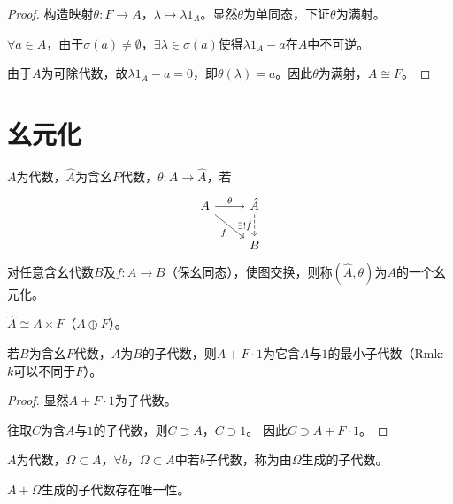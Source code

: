 \documentclass[lang=cn,a4paper,newtx,section]{elegantbook}
\begin{document}
\begin{proof}
  构造映射$\theta: F \to A$，$\lambda \mapsto \lambda 1_A$。显然$\theta$为单同态，下证$\theta$为满射。
  
  $\forall a \in A$，由于$\sigma(a) \neq \emptyset$，$\exists \lambda \in \sigma(a)$使得$\lambda 1_A - a$在$A$中不可逆。
  
  由于$A$为可除代数，故$\lambda 1_A - a = 0$，即$\theta(\lambda) = a$。因此$\theta$为满射，$A \cong F$。
\end{proof}

\section{幺元化}

\begin{definition}[幺元化]
  $A$为代数，$\hat{A}$为含幺$F$代数，$\theta: A \to \hat{A}$，若
  \begin{equation*}
    \begin{tikzcd}
      A \arrow[r, "\theta"] \arrow[dr, "f"'] & \hat{A} \arrow[d, "\exists! \hat{f}"', dashed] \\
      & B
    \end{tikzcd}
  \end{equation*}
  对任意含幺代数$B$及$f: A \to B$（保幺同态），使图交换，则称$(\hat{A}, \theta)$为$A$的一个幺元化。
\end{definition}

\begin{remark}[Banach代数幺元化]
  $\hat{A} \cong A \times F$（$A \oplus F$）。
\end{remark}

\begin{proposition}
  若$B$为含幺$F$代数，$A$为$B$的子代数，则$A + F \cdot 1$为它含$A$与$1$的最小子代数（Rmk: $k$可以不同于$F$）。
\end{proposition}

\begin{proof}
  显然$A + F \cdot 1$为子代数。
  
  往取$C$为含$A$与$1$的子代数，则$C \supset A$，$C \supset 1$。
  因此$C \supset A + F \cdot 1$。
\end{proof}

\begin{definition}[生成子代数]
  $A$为代数，$\Omega \subset A$，$\forall b$，$\Omega \subset A$中若$b$子代数，称为由$\Omega$生成的子代数。
\end{definition}

\begin{proposition}
  $A + \Omega$生成的子代数存在唯一性。
\end{proposition}
\end{document}
